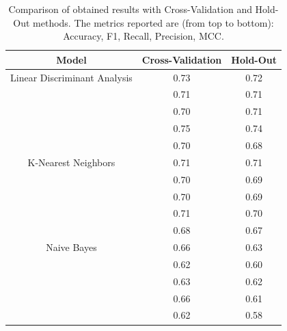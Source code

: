                 \begin{table}[htbp]
                    \centering
                    \caption{Comparison of obtained results with Cross-Validation and Hold-Out methods. The metrics reported are (from top to bottom): Accuracy, F1, Recall, Precision, MCC.}
                    \label{tab:correct_approach_cv}
                    \begin{tabular}{|c|c|c|}
                    \hline
                    \textbf{Model} & \textbf{Cross-Validation} & \textbf{Hold-Out} \\ \hline
                        Linear Discriminant Analysis    & 0.73 & 0.72 \\ 
                                                        & 0.71 & 0.71 \\ 
                                                        & 0.70 & 0.71 \\ 
                                                        & 0.75 & 0.74 \\
                                                        & 0.70 & 0.68 \\ 
                                                        \hline
                        K-Nearest Neighbors             & 0.71 & 0.71 \\ 
                                                        & 0.70 & 0.69 \\ 
                                                        & 0.70 & 0.69 \\ 
                                                        & 0.71 & 0.70 \\
                                                        & 0.68 & 0.67 \\
                                                        \hline
                        Naive Bayes                     & 0.66 & 0.63 \\ 
                                                        & 0.62 & 0.60 \\ 
                                                        & 0.63 & 0.62 \\
                                                        & 0.66 & 0.61 \\ 
                                                        & 0.62 & 0.58 \\ 
                                                        \hline
                    \end{tabular}
                \end{table}
                
